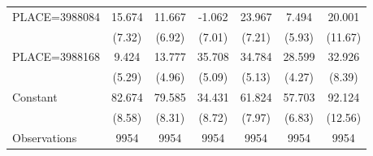 {\begin{tabular}{l*{6}{c}}
PLACE=3988084       &      15.674&      11.667&      -1.062&      23.967&       7.494&      20.001\\
                    &      (7.32)&      (6.92)&      (7.01)&      (7.21)&      (5.93)&     (11.67)\\
PLACE=3988168       &       9.424&      13.777&      35.708&      34.784&      28.599&      32.926\\
                    &      (5.29)&      (4.96)&      (5.09)&      (5.13)&      (4.27)&      (8.39)\\
Constant            &      82.674&      79.585&      34.431&      61.824&      57.703&      92.124\\
                    &      (8.58)&      (8.31)&      (8.72)&      (7.97)&      (6.83)&     (12.56)\\
\hline
Observations        &        9954&        9954&        9954&        9954&        9954&        9954\\
\hline\hline
\end{tabular}
}
